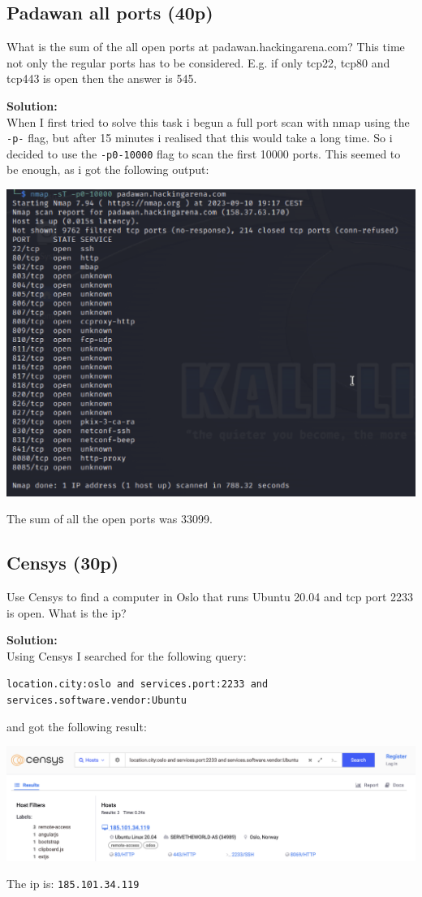 \newpage
\subsection{Padawan all ports (40p)}
What is the sum of the all open ports at padawan.hackingarena.com? This time not only the regular ports has to be considered. E.g. if only tcp22, tcp80 and tcp443 is open then the answer is 545.

\textbf{Solution:}\\
When I first tried to solve this task i begun a full port scan with nmap using the \texttt{-p-} flag, but after 15 minutes i realised that this would take a long time. So i decided to use the \texttt{-p0-10000} flag to scan the first 10000 ports. This seemed to be enough, as i got the following output:

\includegraphics[width=15cm]{img/Network mapping/Padawan all ports/Skjermbilde 2023-09-10 kl. 19.35.19.png}

The sum of all the open ports was 33099.

\newpage
\subsection{Censys (30p)}
Use Censys to find a computer in Oslo that runs Ubuntu 20.04 and tcp port 2233 is open. What is the ip?

\textbf{Solution:}\\
Using Censys I searched for the following query:

\texttt{location.city:oslo and services.port:2233 and services.software.vendor:Ubuntu}

and got the following result:

\includegraphics[width=16cm]{img/Network mapping/Censys/Skjermbilde 2023-10-26 kl. 12.40.17.png}

The ip is: \texttt{185.101.34.119}